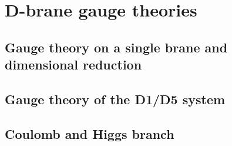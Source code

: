 

\chapter{D-brane gauge theories}
\label{chap:conclusion}
\pagestyle{fancy}

\section{Gauge theory on a single brane and dimensional reduction}

\section{Gauge theory of the D1/D5 system}

\section{Coulomb and Higgs branch}